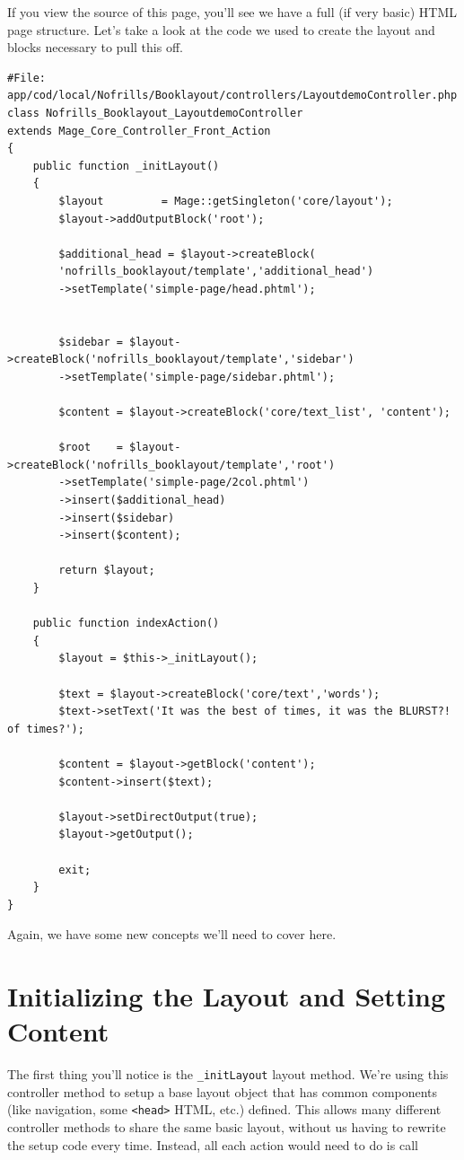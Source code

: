 \documentclass[oneside]{book}
\begin{document}
If you view the source of this page, you'll see we have a full (if very basic) HTML page structure.  Let's take a look at the code we used to create the layout and blocks necessary to pull this off.  

\begin{lstlisting}
#File: app/cod/local/Nofrills/Booklayout/controllers/LayoutdemoController.php
class Nofrills_Booklayout_LayoutdemoController  
extends Mage_Core_Controller_Front_Action
{   
    public function _initLayout()
    {
        $layout         = Mage::getSingleton('core/layout');            
        $layout->addOutputBlock('root');

        $additional_head = $layout->createBlock(
        'nofrills_booklayout/template','additional_head')
        ->setTemplate('simple-page/head.phtml');


        $sidebar = $layout->createBlock('nofrills_booklayout/template','sidebar')
        ->setTemplate('simple-page/sidebar.phtml');

        $content = $layout->createBlock('core/text_list', 'content');           

        $root    = $layout->createBlock('nofrills_booklayout/template','root')
        ->setTemplate('simple-page/2col.phtml')
        ->insert($additional_head)
        ->insert($sidebar)
        ->insert($content);

        return $layout;
    }

    public function indexAction()
    {
        $layout = $this->_initLayout();

        $text = $layout->createBlock('core/text','words');
        $text->setText('It was the best of times, it was the BLURST?! of times?');

        $content = $layout->getBlock('content');
        $content->insert($text);

        $layout->setDirectOutput(true);
        $layout->getOutput();

        exit;
    }
}

\end{lstlisting}


Again, we have some new concepts we'll need to cover here.

\section{Initializing the Layout and Setting Content}

The first thing you'll notice is the \footnotesize\texttt{\_initLayout} \normalsize  layout method.  We're using this controller method to setup a base layout object that has common components (like navigation, some \footnotesize\texttt{\textless head\textgreater } \normalsize  HTML, etc.) defined.   This allows many different controller methods to share the same basic layout, without us having to rewrite the setup code every time.  Instead, all each action would need to do is call
\end{document}
